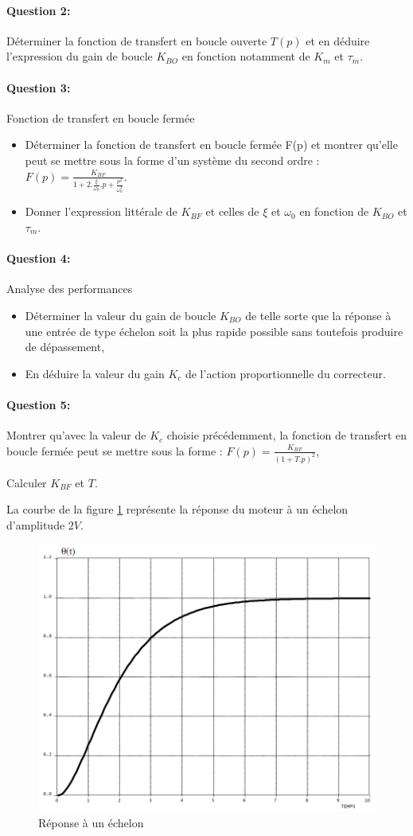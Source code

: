 \paragraph{Question 2:} Déterminer la fonction de transfert en boucle ouverte $T(p)$ et en déduire l'expression du gain de boucle $K_{BO}$ en fonction notamment de $K_m$ et $\tau_m$.

\paragraph{Question 3:} Fonction de transfert en boucle fermée

\begin{itemize}
 \item Déterminer la fonction de transfert en boucle fermée F(p) et montrer qu'elle peut se mettre sous la forme d'un système du second ordre : $F(p)=\frac{K_{BF}}{1+2.\frac{\xi}{\omega_0}.p+\frac{p^2}{\omega_0^2}}$.
 \item Donner l'expression littérale de $K_{BF}$ et celles de $\xi$ et $\omega_0$ en fonction de $K_{BO}$ et $\tau_m$.
\end{itemize}

\paragraph{Question 4:} Analyse des performances

\begin{itemize}
 \item Déterminer la valeur du gain de boucle $K_{BO}$ de telle sorte que la réponse à une entrée de type échelon soit la plus rapide possible sans toutefois produire de dépassement,
 \item En déduire la valeur du gain $K_c$ de l'action proportionnelle du correcteur.
\end{itemize}

\paragraph{Question 5:} Montrer qu'avec la valeur de $K_c$ choisie précédemment, la fonction de transfert en boucle fermée peut se mettre sous la forme : $F(p)=\frac{K_{BF}}{(1+T.p)^2}$,

Calculer $K_{BF}$ et $T$.

La courbe de la figure \ref{fig23} représente la réponse du moteur à un échelon d'amplitude $2V$.

\begin{figure}[!h]
\centering\includegraphics[width=0.5\linewidth]{img/Tracteur23.png}
\caption{Réponse à un échelon}
\label{fig23}
\end{figure}

